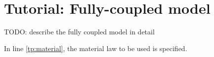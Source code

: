 \chapter[Tutorial: Fully-coupled model]{Tutorial: Fully-coupled model}

TODO: describe the fully coupled model in detail


\begin{lst} \mbox{}

\end{lst}

In line \ref{tp:material}, the material law to be used is specified. 
